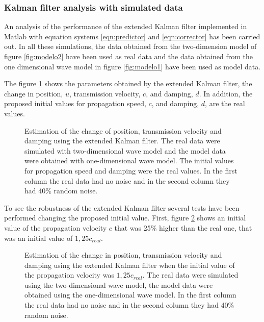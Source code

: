 \documentclass[12pt, a4paper]{article} %
\begin{document}
\setlength{\parskip}{0mm}

\subsubsection{Kalman filter analysis with simulated data}

An analysis of the performance of the extended Kalman filter implemented in Matlab with equation systems \ref{eqn:predictor} and \ref{eqn:corrector} has been carried out. In all these simulations, the data obtained from the two-dimension model of figure \ref{fig:modelo2} have been used as real data and the data obtained from the one dimensional wave model in figure \ref{fig:modelo1} have been used as model data.

\setlength{\parskip}{4mm}

The figure \ref{fig:kalman1} shows the parameters obtained by the extended Kalman filter, the change in position, $u$, transmission velocity, $c$, and damping, $d$. In addition, the proposed initial values for propagation speed, $c$, and damping, $d$, are the real values.

\begin{figure}[h!]
    \centering
    
    \caption{Estimation of the change of position, transmission velocity and damping using the extended Kalman filter. The real data were simulated with two-dimensional wave model and the model data were obtained with one-dimensional wave model. The initial values for propagation speed and damping were the real values. In the first column the real data had no noise and in the second column they had 40\% random noise.}
    \label{fig:kalman1}
\end{figure}

\newpage
To see the robustness of the extended Kalman filter several tests have been performed changing the proposed initial value.  
First, figure \ref{fig:kalman1c} shows an initial value of the propagation velocity $c$ that was 25\% higher than the real one, that was an initial value of $1,25 c_{real}$.

\begin{figure}[h!]
    \centering
    
    \caption{Estimation of the change in position, transmission velocity and damping using the extended Kalman filter when the initial value of the propagation velocity was $1,25 c_{real}$. The real data were simulated using the two-dimensional wave model, the model data were obtained using the one-dimensional wave model. In the first column the real data had no noise and in the second column they had 40\% random noise.}
    \label{fig:kalman1c}
\end{figure}
\end{document}
